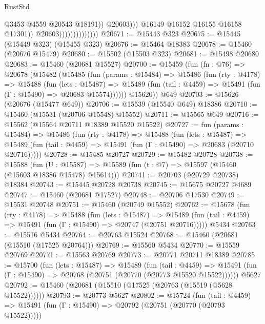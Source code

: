 \begin{lexlean}{RustStd}
\begin{coremodule}
                                              @3453
                                              @4559
                                              @20543
                                              @18191))
                                          @20603)))
                                    @16149
                                    @16152
                                    @16155
                                    @16158
                                    @17301))
                                @20603))))))))))))))
@20671 := @15443 @323
@20675 := @15445 (@15449 @323) (@15455 @323)
@20676 := @15464 @18383
@20678 := @15460 (@20676 @15479)
@20680 := @15502 (@15503 @323)
@20681 := @15498 @20680
@20683 := @15460 (@20681 @15527)
@20700 := @15459
    (fun (fn : @76) =>
    @20678
      (@15482
        (@15485
          (fun (params : @15484) =>
          @15486
            (fun (rty : @4178) =>
            @15488
              (fun (lets : @15487) =>
              @15489 (fun (tail : @4459) => @15491 (fun (Γ : @15490) => @20683 @15574))))))
        @15620))
    @649
@20703 := @15626 (@20676 (@15477 @649))
@20706 := @15539 (@15540 @649) @18386
@20710 := @15460 (@15531 (@20706 @15548) @15552)
@20711 := @15565 @649
@20716 := @15562 (@15564 @20711 @18389 @15520 @15522)
@20727 := fun (params : @15484) =>
  @15486
    (fun (rty : @4178) =>
    @15488
      (fun (lets : @15487) =>
      @15489 (fun (tail : @4459) => @15491 (fun (Γ : @15490) => @20683 (@20710 @20716)))))
@20728 := @15485 @20727
@20729 := @15482 @20728
@20738 := @15588
    (fun (U : @15587) => @15589 (fun (t : @7) => @15597 (@15460 (@15603 @18386 @15478) @15614)))
@20741 := @20703 (@20729 @20738) @18384
@20743 := @15445 @20728 @20738
@20745 := @15675 @20727 @4689
@20747 := @15460 (@20681 @17527)
@20748 := @20706 @17530
@20749 := @15531 @20748
@20751 := @15460 (@20749 @15552)
@20762 := @15678
    (fun (rty : @4178) =>
    @15488
      (fun (lets : @15487) =>
      @15489 (fun (tail : @4459) => @15491 (fun (Γ : @15490) => @20747 (@20751 @20716)))))
    @5434
@20763 := @15516 @5434
@20764 := @20763 @15524
@20768 := @15460 (@20681 (@15510 (@17525 @20764)))
@20769 := @15560 @5434
@20770 := @15559 @20769
@20771 := @15563 @20769
@20773 := @20771 @20711 @18389
@20785 := @15700
    (fun (lets : @15487) =>
    @15489
      (fun (tail : @4459) =>
      @15491 (fun (Γ : @15490) => @20768 (@20751 (@20770 (@20773 @15520 @15522))))))
    @5627
@20792 := @15460 (@20681 (@15510 (@17525 (@20763 (@15519 (@5628 @15522))))))
@20793 := @20773 @5627
@20802 := @15724
    (fun (tail : @4459) => @15491 (fun (Γ : @15490) => @20792 (@20751 (@20770 (@20793 @15522)))))

\end{coremodule}
\end{lexlean}
